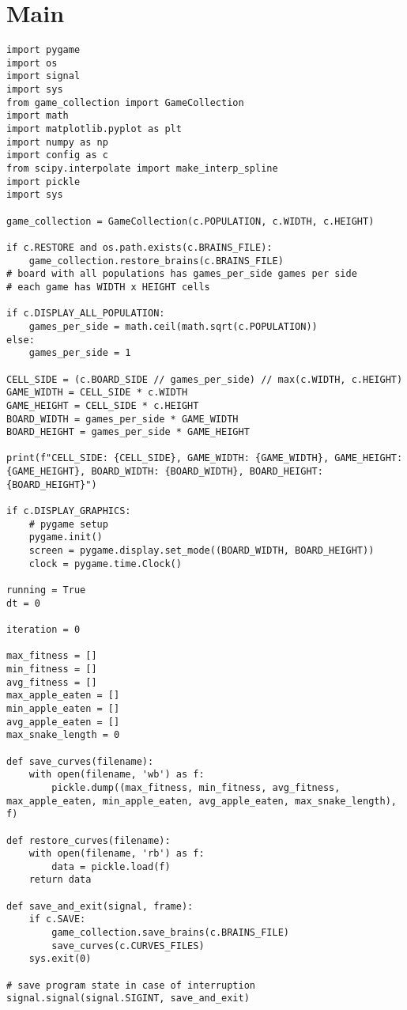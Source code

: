 \documentclass[11pt,a4paper]{article}
\begin{document}
\section{Main}

\begin{verbatim}
import pygame
import os
import signal
import sys
from game_collection import GameCollection
import math
import matplotlib.pyplot as plt
import numpy as np
import config as c
from scipy.interpolate import make_interp_spline
import pickle
import sys

game_collection = GameCollection(c.POPULATION, c.WIDTH, c.HEIGHT)

if c.RESTORE and os.path.exists(c.BRAINS_FILE):
    game_collection.restore_brains(c.BRAINS_FILE)
# board with all populations has games_per_side games per side
# each game has WIDTH x HEIGHT cells

if c.DISPLAY_ALL_POPULATION:
    games_per_side = math.ceil(math.sqrt(c.POPULATION))
else:
    games_per_side = 1

CELL_SIDE = (c.BOARD_SIDE // games_per_side) // max(c.WIDTH, c.HEIGHT)
GAME_WIDTH = CELL_SIDE * c.WIDTH
GAME_HEIGHT = CELL_SIDE * c.HEIGHT
BOARD_WIDTH = games_per_side * GAME_WIDTH
BOARD_HEIGHT = games_per_side * GAME_HEIGHT

print(f"CELL_SIDE: {CELL_SIDE}, GAME_WIDTH: {GAME_WIDTH}, GAME_HEIGHT: {GAME_HEIGHT}, BOARD_WIDTH: {BOARD_WIDTH}, BOARD_HEIGHT: {BOARD_HEIGHT}")

if c.DISPLAY_GRAPHICS:
    # pygame setup
    pygame.init()
    screen = pygame.display.set_mode((BOARD_WIDTH, BOARD_HEIGHT))
    clock = pygame.time.Clock()

running = True
dt = 0

iteration = 0

max_fitness = []
min_fitness = []
avg_fitness = []
max_apple_eaten = []
min_apple_eaten = []
avg_apple_eaten = []
max_snake_length = 0

def save_curves(filename):
    with open(filename, 'wb') as f:
        pickle.dump((max_fitness, min_fitness, avg_fitness, max_apple_eaten, min_apple_eaten, avg_apple_eaten, max_snake_length), f)

def restore_curves(filename):
    with open(filename, 'rb') as f:
        data = pickle.load(f)
    return data

def save_and_exit(signal, frame):
    if c.SAVE:
        game_collection.save_brains(c.BRAINS_FILE)
        save_curves(c.CURVES_FILES)
    sys.exit(0)

# save program state in case of interruption
signal.signal(signal.SIGINT, save_and_exit)


\end{verbatim}
\end{document}
